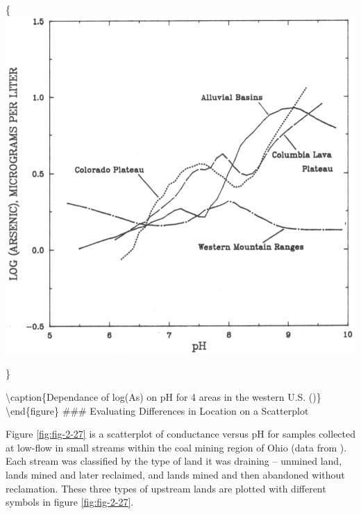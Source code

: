 \documentclass[]{book}
\begin{document}
\{\centering \includegraphics[width=10.64in]{figures/2_26}

\}

\textbackslash{}caption\{Dependance of log(As) on pH for 4 areas in the western U.S. (\citet{welch_arsenic_1988})\}\label{fig:fig-2-26}
\textbackslash{}end\{figure\}
\#\#\# Evaluating Differences in Location on a Scatterplot

Figure \ref{fig:fig-2-27} is a scatterplot of conductance versus pH for samples collected at low-flow in small streams within the coal mining region of Ohio (data from \citet{helsel_mine_1983}). Each stream was classified by the type of land it was draining -- unmined land, lands mined and later reclaimed, and lands mined and then abandoned without reclamation. These three types of upstream lands are plotted with different symbols in figure \ref{fig:fig-2-27}.
\end{document}
